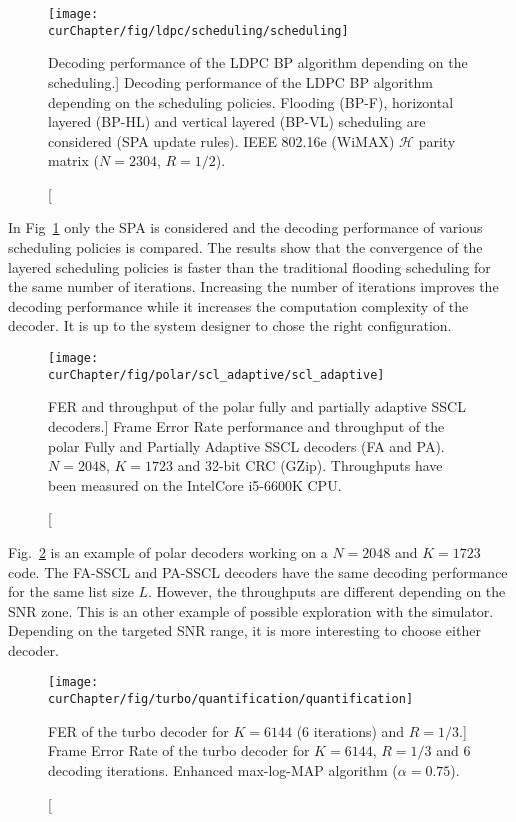 \begin{figure}[htp]
  \centering
  \texttt{[image: \\curChapter/fig/ldpc/scheduling/scheduling]}
  \caption
    [Decoding performance of the LDPC BP algorithm depending on the scheduling.]
    {Decoding performance of the LDPC BP algorithm depending on the scheduling
     policies. Flooding (BP-F), horizontal layered (BP-HL) and vertical layered
     (BP-VL) scheduling are considered (SPA update rules). IEEE 802.16e (WiMAX)
     $\mathcal{H}$ parity matrix ($N=2304$, $R=1/2$).}
  \label{plot:aff3ct_ldpc_scheduling}
\end{figure}

In Fig~\ref{plot:aff3ct_ldpc_scheduling} only the SPA is considered
and the decoding performance of various scheduling policies is compared. The
results show that the convergence of the layered scheduling policies is faster
than the traditional flooding scheduling for the same number of iterations.
Increasing the number of iterations improves the decoding performance while it
increases the computation complexity of the decoder. It is up to the system
designer to chose the right configuration.

\begin{figure}[htp]
  \centering
  \texttt{[image: \\curChapter/fig/polar/scl\_adaptive/scl\_adaptive]}
  \caption
    [FER and throughput of the polar fully and partially adaptive SSCL
     decoders.]
    {Frame Error Rate performance and throughput of the polar Fully and
     Partially Adaptive SSCL decoders (FA and PA). $N = 2048$, $K = 1723$ and
     32-bit CRC (GZip). Throughputs have been measured on the Intel\R Core\TM
     i5-6600K CPU.}
  \label{plot:aff3ct_polar_scl_adaptive}
\end{figure}

Fig.~\ref{plot:aff3ct_polar_scl_adaptive} is an example of polar decoders
working on a $N = 2048$ and $K = 1723$ code. The FA-SSCL and PA-SSCL decoders
have the same decoding performance for the same list size $L$. However, the
throughputs are different depending on the SNR zone. This is an other example of
possible exploration with the \AFFECT simulator. Depending on the targeted SNR
range, it is more interesting to choose either decoder.

\begin{figure}[htp]
  \centering
  \texttt{[image: \\curChapter/fig/turbo/quantification/quantification]}
  \caption
    [FER of the turbo decoder for $K = 6144$ (6 iterations) and
     $R=1/3$.]
    {Frame Error Rate of the turbo decoder for $K = 6144$, $R=1/3$ and 6
     decoding iterations. Enhanced max-log-MAP algorithm ($\alpha = 0.75$).}
  \label{plot:aff3ct_turbo_quantification}
\end{figure}

